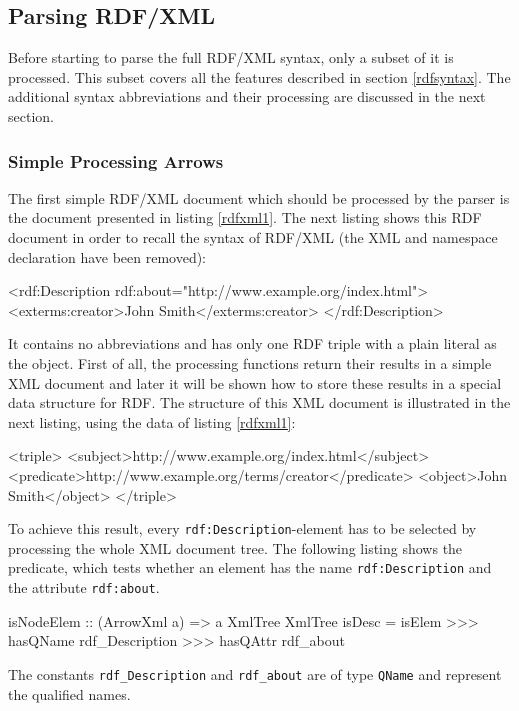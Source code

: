 \documentclass[11pt,a4paper,headsepline, bibtotoc]{scrreprt}
\begin{document}
\subsection{Parsing RDF/XML}
Before starting to parse the full RDF/XML syntax, only a subset of it is processed. This subset covers all the features described in section \ref{rdfsyntax}. The additional syntax abbreviations and their processing are discussed in the next section.

\subsubsection{Simple Processing Arrows}
The first simple RDF/XML document which should be processed by the parser is the document presented in listing \ref{rdfxml1}. The next listing shows this RDF document in order to recall the syntax of RDF/XML (the XML and namespace declaration have been removed):
\begin{blank}
<rdf:Description rdf:about="http://www.example.org/index.html">
    <exterms:creator>John Smith</exterms:creator>
</rdf:Description>
\end{blank}
It contains no abbreviations and has only one RDF triple with a plain literal as the object. First of all, the processing functions return their results in a simple XML document and later it will be shown how to store these results in a special data structure for RDF. The structure of this XML document is illustrated in the next listing, using the data of listing \ref{rdfxml1}:
\begin{blank}[caption=Simple Triple Representation,label=output]
<triple>
    <subject>http://www.example.org/index.html</subject>
    <predicate>http://www.example.org/terms/creator</predicate>
    <object>John Smith</object>
</triple>
\end{blank}
To achieve this result, every \texttt{rdf:Description}-element has to be selected by processing the whole XML document tree. The following listing shows the predicate, which tests whether an element has the name \texttt{rdf:Description} and the attribute \texttt{rdf:about}.
\begin{code}[caption={Predicate detecting Node Elements}] 
isNodeElem :: (ArrowXml a) => a XmlTree XmlTree
isDesc
  = isElem >>> hasQName rdf_Description >>> hasQAttr rdf_about
\end{code}
The constants \texttt{rdf\_Description} and \texttt{rdf\_about} are of type \texttt{QName} and represent the qualified names.\\
\end{document}
